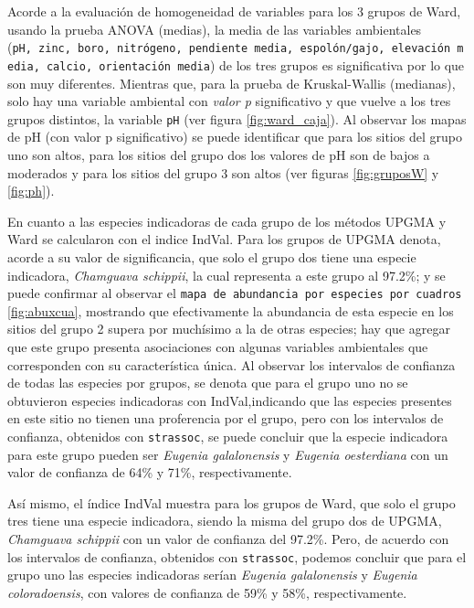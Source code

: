 \documentclass[11pt,]{article}
\begin{document}
Acorde a la evaluación de homogeneidad de variables para los 3 grupos de
Ward, usando la prueba ANOVA (medias), la media de las variables
ambientales
(\texttt{pH,\ zinc,\ boro,\ nitrógeno,\ pendiente\ media,\ espolón/gajo,\ elevación\ media,\ calcio,\ orientación\ media})
de los tres grupos es significativa por lo que son muy diferentes.
Mientras que, para la prueba de Kruskal-Wallis (medianas), solo hay una
variable ambiental con \emph{valor p} significativo y que vuelve a los
tres grupos distintos, la variable \texttt{pH} (ver figura
\ref{fig:ward_caja}). Al observar los mapas de pH (con valor p
significativo) se puede identificar que para los sitios del grupo uno
son altos, para los sitios del grupo dos los valores de pH son de bajos
a moderados y para los sitios del grupo 3 son altos (ver figuras
\ref{fig:gruposW} y \ref{fig:ph}).

En cuanto a las especies indicadoras de cada grupo de los métodos UPGMA
y Ward se calcularon con el indice IndVal. Para los grupos de UPGMA
denota, acorde a su valor de significancia, que solo el grupo dos tiene
una especie indicadora, \emph{Chamguava schippii}, la cual representa a
este grupo al 97.2\%; y se puede confirmar al observar el
\texttt{mapa\ de\ abundancia\ por\ especies\ por\ cuadros}
\ref{fig:abuxcua}, mostrando que efectivamente la abundancia de esta
especie en los sitios del grupo 2 supera por muchísimo a la de otras
especies; hay que agregar que este grupo presenta asociaciones con
algunas variables ambientales que corresponden con su característica
única. Al observar los intervalos de confianza de todas las especies por
grupos, se denota que para el grupo uno no se obtuvieron especies
indicadoras con IndVal,indicando que las especies presentes en este
sitio no tienen una proferencia por el grupo, pero con los intervalos de
confianza, obtenidos con \texttt{strassoc}, se puede concluir que la
especie indicadora para este grupo pueden ser \emph{Eugenia
galalonensis} y \emph{Eugenia oesterdiana} con un valor de confianza de
64\% y 71\%, respectivamente.

Así mismo, el índice IndVal muestra para los grupos de Ward, que solo el
grupo tres tiene una especie indicadora, siendo la misma del grupo dos
de UPGMA, \emph{Chamguava schippii} con un valor de confianza del
97.2\%. Pero, de acuerdo con los intervalos de confianza, obtenidos con
\texttt{strassoc}, podemos concluir que para el grupo uno las especies
indicadoras serían \emph{Eugenia galalonensis} y \emph{Eugenia
coloradoensis}, con valores de confianza de 59\% y 58\%,
respectivamente.
\end{document}
